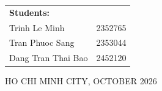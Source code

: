 \begin{titlepage}
\begin{table}[h]
\begin{tabular}{p{6cm} r}
\textbf{Students:} &  \\

Trinh Le Minh      & 2352765 \\
Tran Phuoc Sang    & 2353044 \\
Dang Tran Thai Bao & 2452120  \\

\end{tabular}
\end{table}


\vspace{1cm}
\begin{center}
{\footnotesize HO CHI MINH CITY, OCTOBER 2026}
\end{center}
\end{titlepage}
\pagebreak
